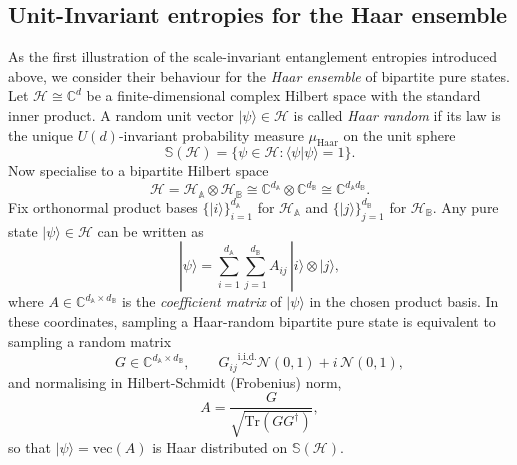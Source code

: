 \documentclass[11pt,a4paper]{article}
\newcommand{\be}{\begin{equation}}
\newcommand{\ee}{\end{equation}}
\begin{document}
\subsection{Unit-Invariant entropies for the Haar ensemble} 
As the first illustration of the scale-invariant entanglement entropies introduced above, we consider their behaviour for the \emph{Haar ensemble} of bipartite pure states. Let $\mathcal{H}\cong\mathbb{C}^d$ be a finite-dimensional complex Hilbert space with the standard inner product. A random unit vector $|\psi\rangle\in\mathcal{H}$ is called \emph{Haar random} \cite{Page:1993AverageEntropy,Vershynin2018HDP,Mezzadri:2007Haar,Zyczkowski:2001Induced} if its law is the unique $U(d)$-invariant probability measure $\mu_{\mathrm{Haar}}$ on the unit sphere
\begin{equation}
\mathbb{S}(\mathcal{H})=\{\psi\in\mathcal{H}:\langle\psi|\psi\rangle=1\}.
\end{equation}
Now specialise to a bipartite Hilbert space
\be
\mathcal{H}=\mathcal{H}_{\mathbb{A}}\otimes \mathcal{H}_{\mathbb{B}}
\cong \mathbb{C}^{d_{\mathbb{A}}}\otimes \mathbb{C}^{d_{\mathbb{B}}}
\cong \mathbb{C}^{d_{\mathbb{A}}d_{\mathbb{B}}}.
\ee
Fix orthonormal product bases $\{|i\rangle\}_{i=1}^{d_{\mathbb{A}}}$ for $\mathcal{H}_{\mathbb{A}}$ and $\{|j\rangle\}_{j=1}^{d_{\mathbb{B}}}$ for $\mathcal{H}_{\mathbb{B}}$. Any pure state $|\psi\rangle\in\mathcal{H}$ can be written as
\begin{equation}
|\psi\rangle=\sum_{i=1}^{d_{\mathbb{A}}}\sum_{j=1}^{d_{\mathbb{B}}} A_{ij}\,|i\rangle\otimes|j\rangle,
\end{equation}
where $A\in\mathbb{C}^{d_{\mathbb{A}}\times d_{\mathbb{B}}}$ is the \emph{coefficient matrix} of $|\psi\rangle$ in the chosen product basis. In these coordinates, sampling a Haar-random bipartite pure state is equivalent to sampling a random matrix
\begin{equation}
G\in\mathbb{C}^{d_{\mathbb{A}}\times d_{\mathbb{B}}},\qquad
G_{ij}\stackrel{\mathrm{i.i.d.}}{\sim}\mathcal{N}(0,1)+ i\,\mathcal{N}(0,1),
\end{equation}
and normalising in Hilbert-Schmidt (Frobenius) norm,
\begin{equation}
A=\frac{G}{\sqrt{\mathrm{Tr}(G G^\dagger)}},
\end{equation}
so that $|\psi\rangle=\mathrm{vec}(A)$ is Haar distributed on $\mathbb{S}(\mathcal{H})$. 
\end{document}
